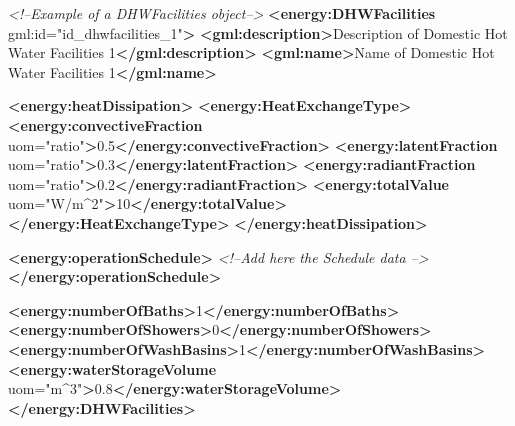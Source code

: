 \documentclass[a4paper,12pt]{article}
\newenvironment{Shaded}{}{}
\newcommand{\KeywordTok}[1]{\textcolor[rgb]{0.00,0.44,0.13}{\textbf{{#1}}}}
\newcommand{\StringTok}[1]{\textcolor[rgb]{0.25,0.44,0.63}{{#1}}}
\newcommand{\CommentTok}[1]{\textcolor[rgb]{0.38,0.63,0.69}{\textit{{#1}}}}
\newcommand{\OtherTok}[1]{\textcolor[rgb]{0.00,0.44,0.13}{{#1}}}
\newcommand{\NormalTok}[1]{{#1}}
\begin{document}
\begin{Shaded}
\begin{Highlighting}[]
\CommentTok{<!--Example of a DHWFacilities object-->}
\KeywordTok{<energy:DHWFacilities}\OtherTok{ gml:id=}\StringTok{"id_dhwfacilities_1"}\KeywordTok{>}
    \KeywordTok{<gml:description>}\NormalTok{Description of Domestic Hot Water Facilities 1}\KeywordTok{</gml:description>}
    \KeywordTok{<gml:name>}\NormalTok{Name of Domestic Hot Water Facilities 1}\KeywordTok{</gml:name>}

    \KeywordTok{<energy:heatDissipation>}
        \KeywordTok{<energy:HeatExchangeType>}
            \KeywordTok{<energy:convectiveFraction}\OtherTok{ uom=}\StringTok{"ratio"}\KeywordTok{>}\NormalTok{0.5}\KeywordTok{</energy:convectiveFraction>}
            \KeywordTok{<energy:latentFraction}\OtherTok{ uom=}\StringTok{"ratio"}\KeywordTok{>}\NormalTok{0.3}\KeywordTok{</energy:latentFraction>}
            \KeywordTok{<energy:radiantFraction}\OtherTok{ uom=}\StringTok{"ratio"}\KeywordTok{>}\NormalTok{0.2}\KeywordTok{</energy:radiantFraction>}
            \KeywordTok{<energy:totalValue}\OtherTok{ uom=}\StringTok{"W/m^2"}\KeywordTok{>}\NormalTok{10}\KeywordTok{</energy:totalValue>}
        \KeywordTok{</energy:HeatExchangeType>}
    \KeywordTok{</energy:heatDissipation>}

    \KeywordTok{<energy:operationSchedule>}
        \CommentTok{<!--Add here the Schedule data -->}
    \KeywordTok{</energy:operationSchedule>}

    \KeywordTok{<energy:numberOfBaths>}\NormalTok{1}\KeywordTok{</energy:numberOfBaths>}
    \KeywordTok{<energy:numberOfShowers>}\NormalTok{0}\KeywordTok{</energy:numberOfShowers>}
    \KeywordTok{<energy:numberOfWashBasins>}\NormalTok{1}\KeywordTok{</energy:numberOfWashBasins>}
    \KeywordTok{<energy:waterStorageVolume}\OtherTok{ uom=}\StringTok{"m^3"}\KeywordTok{>}\NormalTok{0.8}\KeywordTok{</energy:waterStorageVolume>}
\KeywordTok{</energy:DHWFacilities>}
\end{Highlighting}
\end{Shaded}
\end{document}

